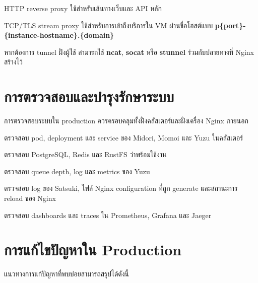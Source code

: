 \begin{mycustomenum2}
    \item HTTP reverse proxy ใช้สำหรับเส้นทางเว็บและ API หลัก
    \item TCP/TLS stream proxy ใช้สำหรับการเข้าถึงบริการใน VM ผ่านชื่อโฮสต์แบบ \textbf{p\{port\}-\{instance-hostname\}.\{domain\}}
    \item หากต้องการ tunnel ฝั่งผู้ใช้ สามารถใช้ \textbf{ncat}, \textbf{socat} หรือ \textbf{stunnel} ร่วมกับปลายทางที่ Nginx สร้างไว้
\end{mycustomenum2}

\section{การตรวจสอบและบำรุงรักษาระบบ}
\hspace*{1.3em}
การตรวจสอบระบบใน production ควรครอบคลุมทั้งฝั่งคลัสเตอร์และฝั่งเครื่อง Nginx ภายนอก

\begin{mycustomenum2}
    \item ตรวจสอบ pod, deployment และ service ของ Midori, Momoi และ Yuzu ในคลัสเตอร์
    \item ตรวจสอบ PostgreSQL, Redis และ RustFS ว่าพร้อมใช้งาน
    \item ตรวจสอบ queue depth, log และ metrics ของ Yuzu
    \item ตรวจสอบ log ของ Satsuki, ไฟล์ Nginx configuration ที่ถูก generate และสถานะการ reload ของ Nginx
    \item ตรวจสอบ dashboards และ traces ใน Prometheus, Grafana และ Jaeger
\end{mycustomenum2}

\section{การแก้ไขปัญหาใน Production}
\hspace*{1.3em}
แนวทางการแก้ปัญหาที่พบบ่อยสามารถสรุปได้ดังนี้

